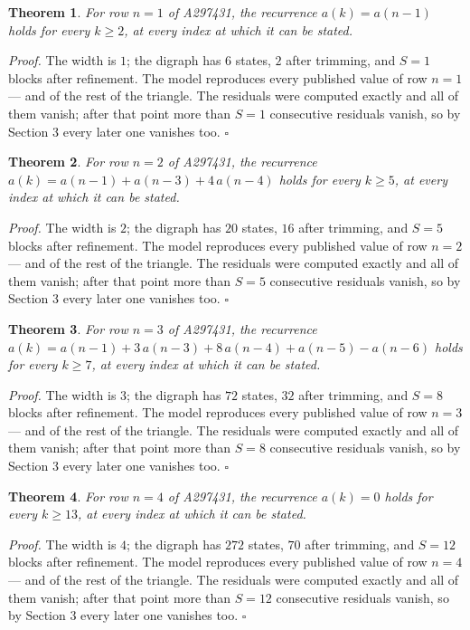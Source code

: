 \documentclass[11pt]{article}
\newtheorem{theorem}{Theorem}
\theoremstyle{definition}
\begin{document}
\begin{theorem} For row $n = 1$ of A297431, the recurrence $a(k) = a(n-1)$ holds for every $k \ge 2$, at every index at which it can be stated.\end{theorem}

{\itshape Proof.} The width is $1$; the digraph has $6$ states, $2$ after trimming, and $S = 1$ blocks after refinement. The model reproduces every published value of row $n = 1$ --- and of the rest of the triangle. The residuals were computed exactly and all of them vanish; after that point more than $S = 1$ consecutive residuals vanish, so by Section 3 every later one vanishes too. $\square$

\begin{theorem} For row $n = 2$ of A297431, the recurrence $a(k) = a(n-1) + a(n-3) + 4\,a(n-4)$ holds for every $k \ge 5$, at every index at which it can be stated.\end{theorem}

{\itshape Proof.} The width is $2$; the digraph has $20$ states, $16$ after trimming, and $S = 5$ blocks after refinement. The model reproduces every published value of row $n = 2$ --- and of the rest of the triangle. The residuals were computed exactly and all of them vanish; after that point more than $S = 5$ consecutive residuals vanish, so by Section 3 every later one vanishes too. $\square$

\begin{theorem} For row $n = 3$ of A297431, the recurrence $a(k) = a(n-1) + 3\,a(n-3) + 8\,a(n-4) + a(n-5) - a(n-6)$ holds for every $k \ge 7$, at every index at which it can be stated.\end{theorem}

{\itshape Proof.} The width is $3$; the digraph has $72$ states, $32$ after trimming, and $S = 8$ blocks after refinement. The model reproduces every published value of row $n = 3$ --- and of the rest of the triangle. The residuals were computed exactly and all of them vanish; after that point more than $S = 8$ consecutive residuals vanish, so by Section 3 every later one vanishes too. $\square$

\begin{theorem} For row $n = 4$ of A297431, the recurrence $a(k) = 0$ holds for every $k \ge 13$, at every index at which it can be stated.\end{theorem}

{\itshape Proof.} The width is $4$; the digraph has $272$ states, $70$ after trimming, and $S = 12$ blocks after refinement. The model reproduces every published value of row $n = 4$ --- and of the rest of the triangle. The residuals were computed exactly and all of them vanish; after that point more than $S = 12$ consecutive residuals vanish, so by Section 3 every later one vanishes too. $\square$
\end{document}
